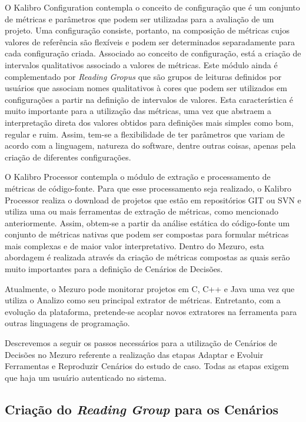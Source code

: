 O Kalibro Configuration contempla o conceito de configuração que é um conjunto de métricas e parâmetros que podem ser utilizadas para a avaliação de um projeto. Uma configuração consiste, portanto, na composição de métricas cujos valores de referência são flexíveis e podem ser determinados separadamente para cada configuração criada. Associado ao conceito de configuração, está a criação de intervalos qualitativos associado a valores de métricas. Este módulo ainda é complementado por \emph{Reading Gropus} que são grupos de leituras definidos por usuários que associam nomes qualitativos à cores que podem ser utilizados em configurações a partir na definição de intervalos de valores. Esta característica é muito importante para a utilização das métricas, uma vez que abstraem a interpretação direta dos valores obtidos para definições mais simples como bom, regular e ruim. Assim, tem-se a flexibilidade de ter parâmetros que variam de acordo com a linguagem, natureza do software, dentre outras coisas, apenas pela criação de diferentes configurações. 

O Kalibro Processor contempla o módulo de extração e processamento de métricas de código-fonte. Para que esse processamento seja realizado, o Kalibro Processor realiza o download de projetos que estão em repositórios GIT ou SVN e utiliza uma ou mais ferramentas de extração de métricas, como mencionado anteriormente. Assim, obtem-se a partir da análise estática do código-fonte um conjunto de métricas nativas que podem ser compostas para formular métricas mais complexas e de maior valor interpretativo. Dentro do Mezuro, esta abordagem é realizada através da criação de métricas compostas as quais serão muito importantes para a definição de Cenários de Decisões. 

Atualmente, o Mezuro pode monitorar projetos em C, C++ e Java uma vez que utiliza o Analizo como seu principal extrator de métricas. Entretanto, com a evolução da plataforma, pretende-se acoplar novos extratores na ferramenta para outras linguagens de programação.

Descrevemos a seguir os passos necessários para a utilização de Cenários de Decisões no Mezuro referente a realização das etapas Adaptar e Evoluir Ferramentas  e Reproduzir Cenários do estudo de caso. Todas as etapas exigem que haja um usuário autenticado no sistema.

\subsection{Criação do \emph{Reading Group} para os Cenários}

